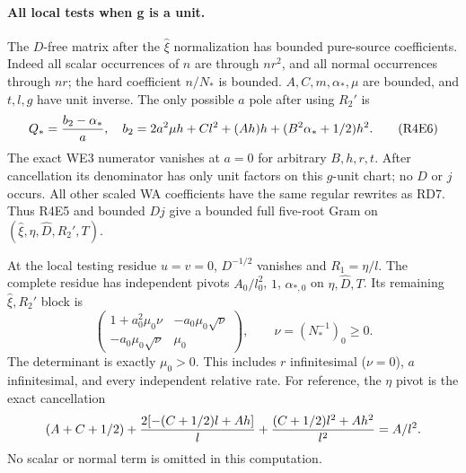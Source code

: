 \paragraph{All local tests when g is a unit.}
The $D$-free matrix after the $\widehat\xi$ normalization has bounded
pure-source coefficients. Indeed all scalar occurrences of $n$ are
through $nr^2$, and all normal occurrences through $nr$; the hard
coefficient $n/N_*$ is bounded. $A,C,m,\alpha_*,\mu$ are bounded,
and $t,l,g$ have unit inverse. The only possible $a$ pole after using
$R_2'$ is
\[
 Q_*={b_2-\alpha_*\over a},\quad
 b_2=2a^2\mu h+Cl^2+(Ah)h+(B^2\alpha_*+1/2)h^2.     \tag{R4E6}
\]
The exact WE3 numerator vanishes at $a=0$ for arbitrary $B,h,r,t$.
After cancellation its denominator has only unit factors on this
$g$-unit chart; no $D$ or $j$ occurs. All other scaled WA coefficients
have the same regular rewrites as RD7. Thus R4E5 and bounded $Dj$
give a bounded full five-root Gram on
$(\widehat\xi,\eta,\widehat D,R_2',T)$.

At the local testing residue $u=v=0$, $D^{-1/2}$ vanishes and
$R_1=\eta/l$. The complete residue has independent pivots
$A_0/l_0^2$, $1$, $\alpha_{*,0}$ on $\eta,\widehat D,T$.
Its remaining $\widehat\xi,R_2'$ block is
\[
 \begin{pmatrix}
 1+a_0^2\mu_0\nu&-a_0\mu_0\sqrt\nu\\
 -a_0\mu_0\sqrt\nu&\mu_0
 \end{pmatrix},\qquad
 \nu=(N_*^{-1})_0\ge0.                              \tag{R4E7}
\]
The determinant is exactly $\mu_0>0$. This includes $r$ infinitesimal
($\nu=0$), $a$ infinitesimal, and every independent relative rate.
For reference, the $\eta$ pivot is the exact cancellation
\[
 (A+C+1/2)+{2[-(C+1/2)l+Ah]\over l}
       +{(C+1/2)l^2+Ah^2\over l^2}=A/l^2.
\]
No scalar or normal term is omitted in this computation.

